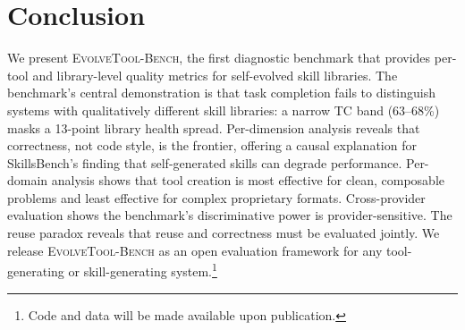\documentclass[sigplan,review,anonymous]{acmart}
\begin{document}
\section{Conclusion}

We present \textsc{EvolveTool-Bench}, the first diagnostic benchmark that provides per-tool and library-level quality metrics for self-evolved skill libraries. The benchmark's central demonstration is that task completion fails to distinguish systems with qualitatively different skill libraries: a narrow TC band (63--68\%) masks a 13-point library health spread. Per-dimension analysis reveals that correctness, not code style, is the frontier, offering a causal explanation for SkillsBench's finding that self-generated skills can degrade performance. Per-domain analysis shows that tool creation is most effective for clean, composable problems and least effective for complex proprietary formats. Cross-provider evaluation shows the benchmark's discriminative power is provider-sensitive. The reuse paradox reveals that reuse and correctness must be evaluated jointly. We release \textsc{EvolveTool-Bench} as an open evaluation framework for any tool-generating or skill-generating system.\footnote{Code and data will be made available upon publication.}



\end{document}
